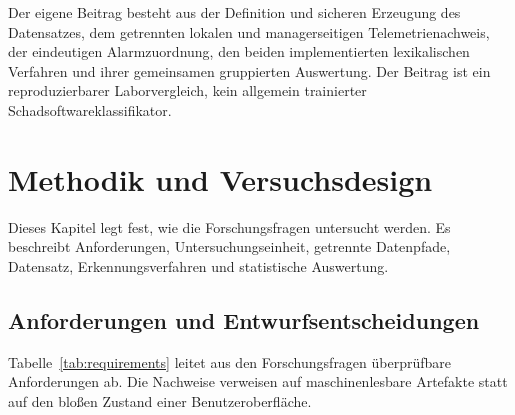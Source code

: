 \documentclass[12pt,a4paper,oneside,parskip=half]{scrreprt}
\begin{document}
Der eigene Beitrag besteht aus der Definition und sicheren Erzeugung des Datensatzes, dem getrennten lokalen und managerseitigen Telemetrienachweis, der eindeutigen Alarmzuordnung, den beiden implementierten lexikalischen Verfahren und ihrer gemeinsamen gruppierten Auswertung. Der Beitrag ist ein reproduzierbarer Laborvergleich, kein allgemein trainierter Schadsoftwareklassifikator.
\chapter{Methodik und Versuchsdesign}

Dieses Kapitel legt fest, wie die Forschungsfragen untersucht werden. Es beschreibt Anforderungen, Untersuchungseinheit, getrennte Datenpfade, Datensatz, Erkennungsverfahren und statistische Auswertung.

\section{Anforderungen und Entwurfsentscheidungen}
Tabelle~\ref{tab:requirements} leitet aus den Forschungsfragen überprüfbare Anforderungen ab. Die Nachweise verweisen auf maschinenlesbare Artefakte statt auf den bloßen Zustand einer Benutzeroberfläche.
\end{document}

